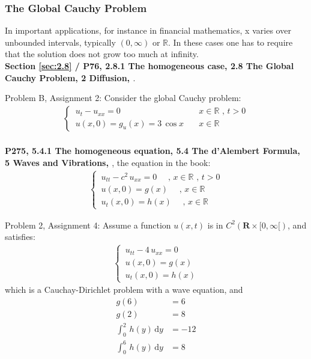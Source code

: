 \documentclass[../main.tex]{subfiles}
\begin{document}
\subsubsection{The Global Cauchy Problem}

In important applications, for instance in financial mathematics, x varies over unbounded intervals, typically $(0, \infty)$ or $\mathbb{R}$. In these cases one has to require that the solution does not grow too much at infinity. \\

\textbf{Section \ref{sec:2.8} / P76, 2.8.1 The homogeneous case, 2.8 The Global Cauchy Problem, 2 Diffusion, \cite{salsa2016partial}}.

Problem B, Assignment 2: Consider the global Cauchy problem:
\begin{align}
    \begin{cases}
        \, u_t - u_{xx} = 0 \quad & x \in \mathbb{R} \text{ ,  } t > 0 \\
        \, u(x,0) = g_u(x) = 3 \, \cos{x} \quad & x \in \mathbb{R}
    \end{cases}
\end{align} \\

\textbf{P275, 5.4.1 The homogeneous equation, 5.4 The d'Alembert Formula, 5 Waves and Vibrations, \cite{salsa2016partial}}, the equation in the book:
\begin{align}
    \begin{cases} \nonumber
        \, u_{tt} - c^2 \, u_{xx} = 0 \quad \text{ ,  } x \in \mathbb{R} \text{ ,  } t > 0\\
        \, u(x, 0) = g(x) \quad \text{ ,  } x \in \mathbb{R} \\
        \, u_t(x, 0) = h(x)\quad \text{ ,  } x \in \mathbb{R}
    \end{cases}
\end{align}

Problem 2, Assignment 4: Assume a function $u(x, t)$ is in $C^2(\mathbf{R} \times [0, \infty[)$, and satisfies:
\begin{align}
    \begin{cases} \nonumber
        \, u_{tt} - 4 \, u_{xx} = 0 \\
        \, u(x, 0) = g(x) \\
        \, u_t(x, 0) = h(x) 
    \end{cases}
\end{align}
which is a Cauchay-Dirichlet problem with a wave equation, and
\begin{align}
    g(6) &= 6 \nonumber \\
    g(2) &= 8 \nonumber \\
    \int_0^2 \, h(y) \, \mathrm{d} y &= - 12 \nonumber \\
    \int_0^6 \, h(y) \, \mathrm{d} y &= 8 \nonumber
\end{align} \\
\end{document}
